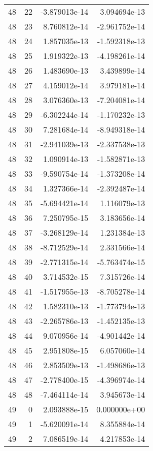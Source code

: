 \begin{tabular}{rrrr}
  48 &   22 & -3.879013e-14 &  3.094694e-13 \\
  48 &   23 &  8.760812e-14 & -2.961752e-14 \\
  48 &   24 &  1.857035e-13 & -1.592318e-13 \\
  48 &   25 &  1.919322e-13 & -4.198261e-14 \\
  48 &   26 &  1.483690e-13 &  3.439899e-14 \\
  48 &   27 &  4.159012e-14 &  3.979181e-14 \\
  48 &   28 &  3.076360e-13 & -7.204081e-14 \\
  48 &   29 & -6.302244e-14 & -1.170232e-13 \\
  48 &   30 &  7.281684e-14 & -8.949318e-14 \\
  48 &   31 & -2.941039e-13 & -2.337538e-13 \\
  48 &   32 &  1.090914e-13 & -1.582871e-13 \\
  48 &   33 & -9.590754e-14 & -1.373208e-14 \\
  48 &   34 &  1.327366e-14 & -2.392487e-14 \\
  48 &   35 & -5.694421e-14 &  1.116079e-13 \\
  48 &   36 &  7.250795e-15 &  3.183656e-14 \\
  48 &   37 & -3.268129e-14 &  1.231384e-13 \\
  48 &   38 & -8.712529e-14 &  2.331566e-14 \\
  48 &   39 & -2.771315e-14 & -5.763474e-15 \\
  48 &   40 &  3.714532e-15 &  7.315726e-14 \\
  48 &   41 & -1.517955e-13 & -8.705278e-14 \\
  48 &   42 &  1.582310e-13 & -1.773794e-13 \\
  48 &   43 & -2.265786e-13 & -1.452135e-13 \\
  48 &   44 &  9.070956e-14 & -4.901442e-14 \\
  48 &   45 &  2.951808e-15 &  6.057060e-14 \\
  48 &   46 &  2.853509e-13 & -1.498686e-13 \\
  48 &   47 & -2.778400e-15 & -4.396974e-14 \\
  48 &   48 & -7.464114e-14 &  3.945673e-14 \\
  49 &    0 &  2.093888e-15 &  0.000000e+00 \\
  49 &    1 & -5.620091e-14 &  8.355884e-14 \\
  49 &    2 &  7.086519e-14 &  4.217853e-14 \\

\end{tabular}
